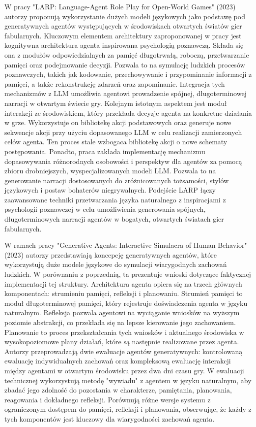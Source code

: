 W pracy "LARP: Language-Agent Role Play for Open-World Games" (2023)\cite{larp_language} autorzy
proponują wykorzystanie dużych modeli językowych jako podstawę pod generatywnych agentów
występujących w środowiskach otwartych światów gier fabularnych. Kluczowym elementem architektury
zaproponowanej w pracy jest kognitywna architektura agenta inspirowana psychologią poznawczą. Składa
się ona z modułów odpowiedzialnych za pamięć długotrwałą, roboczą, przetwarzanie pamięci oraz
podejmowanie decyzji. Pozwala to na symulację ludzkich procesów poznawczych, takich jak kodowanie,
przechowywanie i przypominanie informacji z pamięci, a także rekonstrukcję zdarzeń oraz zapominanie.
Integracja tych mechanizmów z LLM umożliwia agentowi prowadzenie spójnej, długoterminowej narracji w
otwartym świecie gry. Kolejnym istotnym aspektem jest moduł interakcji ze środowiskiem, który przekłada
decyzje agenta na konkretne działania w grze. Wykorzystuje on bibliotekę akcji podstawowych oraz generuje
nowe sekwencje akcji przy użyciu dopasowanego LLM w celu realizacji zamierzonych celów agenta. Ten proces
stale wzbogaca bibliotekę akcji o nowe schematy postępowania. Ponadto, praca zakłada implementację
mechanizmu dopasowywania różnorodnych osobowości i perspektyw dla agentów za pomocą zbioru
drobniejszych, wyspecjalizowanych modeli LLM. Pozwala to na generowanie narracji dostosowanych do
zróżnicowanych tożsamości, stylów językowych i postaw bohaterów niegrywalnych. Podejście LARP łączy
zaawansowane techniki przetwarzania języka naturalnego z inspiracjami z psychologii poznawczej w celu
umożliwienia generowania spójnych, długoterminowych narracji agentów w bogatych, otwartych światach gier
fabularnych\cite{larp_language}.

W ramach pracy "Generative Agents: Interactive Simulacra of Human Behavior" (2023)\cite{ai_town_ref} autorzy przedstawiają koncepcję
generatywnych agentów, które wykorzystują duże modele językowe do symulacji wiarygodnych zachowań
ludzkich. W porównaniu z poprzednią, ta prezentuje wnioski dotyczące faktycznej implementacji tej struktury.
Architektura agenta opiera się na trzech głównych komponentach: strumieniu pamięci, refleksji
i planowaniu. Strumień pamięci to moduł długoterminowej pamięci, który rejestruje doświadczenia agenta
w języku naturalnym. Refleksja pozwala agentowi na wyciąganie wniosków na wyższym poziomie abstrakcji,
co przekłada się na lepsze kierowanie jego zachowaniem. Planowanie to proces przekształcania tych
wniosków i aktualnego środowiska w wysokopoziomowe plany działań, które są następnie realizowane przez
agenta. Autorzy przeprowadzają dwie ewaluacje agentów generatywnych: kontrolowaną ewaluację indywidualnych
zachowań oraz kompleksową ewaluację interakcji między agentami w otwartym środowisku przez dwa dni czasu gry.
W ewaluacji technicznej wykorzystują metodę "wywiadu" z agentem w języku naturalnym, aby zbadać jego zdolność
do pozostania w charakterze, pamiętania, planowania, reagowania i dokładnego refleksji. Porównują różne
wersje systemu z ograniczonym dostępem do pamięci, refleksji i planowania, obserwując, że każdy z tych
komponentów jest kluczowy dla wiarygodności zachowań agenta\cite{ai_town_ref}.

